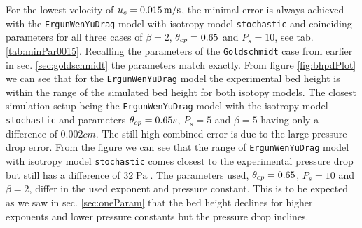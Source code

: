 For the lowest velocity of $u_c = 0.015 \operatorname{m/s}$, the minimal error is always achieved with the \lstinline|ErgunWenYuDrag| model with isotropy model \lstinline|stochastic| and coinciding parameters for all three cases of $\beta = 2$, $\theta_{cp} = 0.65$ and $P_s = 10$, see tab. \ref{tab:minPar0015}. Recalling the parameters of the \lstinline|Goldschmidt| case from earlier in sec. \ref{sec:goldschmidt} the parameters match exactly.
From figure \ref{fig:bhpdPlot} we can see that for the \lstinline|ErgunWenYuDrag| model the experimental bed height is within the range of the simulated bed height for both isotopy models. The closest simulation setup being the \lstinline|ErgunWenYuDrag| model with the isotropy model \lstinline|stochastic| and parameters $\theta_{cp} = 0.65s$, $P_s = 5$ and $\beta = 5$  having only a difference of $0.002cm$.
The still high combined error is due to the large pressure drop error.
From the figure we can see that the range of \lstinline|ErgunWenYuDrag| model with isotropy model \lstinline|stochastic| comes closest to the experimental pressure drop but still has a difference of $32 \operatorname{Pa}$. The parameters used, $\theta_{cp} = 0.65$, $P_s = 10$ and $\beta = 2$, differ in the used exponent and pressure constant. 
This is to be expected as we saw in sec. \ref{sec:oneParam} that the bed height declines for higher exponents and lower pressure constants but the pressure drop inclines.


